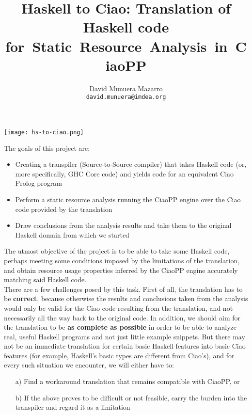 \documentclass[11pt]{article}
\title{
  Haskell to Ciao: Translation of Haskell code for~Static~Resource~Analysis~in~CiaoPP}
\author{David Munuera Mazarro \\ \texttt{david.munuera@imdea.org}}
\date{}
\begin{document}

\pagebreak

\begin{minipage}{1.0\linewidth}

  {\hspace{4.6cm}
    \texttt{[image: hs-to-ciao.png]}}

  \vspace{-1.3cm}

\maketitle
  
\end{minipage}

The goals of this project are:
\begin{itemize}
\item Creating a transpiler (Source-to-Source compiler) that takes Haskell code (or, more specifically, GHC Core code)
  and yields code for an equivalent Ciao Prolog program
\item Perform a static resource analysis
  running the CiaoPP engine over the Ciao code provided by the translation
\item Draw conclusions from the analysis results
  and take them to the original Haskell domain from which we started
\end{itemize}
The utmost objective of the project is to be able to take some Haskell code,
perhaps meeting some conditions imposed by the limitations of the translation,
and obtain resource usage properties inferred by
the CiaoPP engine accurately matching said Haskell code. \\

There are a few challenges posed by this task.
First of all, the translation has to be \textbf{correct},
because otherwise the results and conclusions taken from the analysis
would only be valid for the Ciao code resulting from the translation,
and not necessarily all the way back to the original code. In addition,
we should aim for the translation to be \textbf{as complete as possible} in order
to be able to analyze real, useful Haskell programs and not just
little example snippets.
But there may not be an immediate translation for certain basic Haskell features
into basic Ciao features (for example, Haskell's basic types are
different from Ciao's), and for every such situation we encounter,
we will either have to:

\begin{enumerate}
\item[a)] Find a workaround translation that remains compatible with CiaoPP, or
\item[b)] If the above proves to be difficult or not feasible,
  carry the burden into the transpiler and regard it as a limitation
\end{enumerate}
\end{document}
